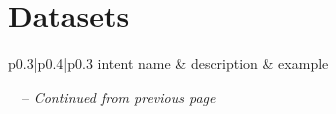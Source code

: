\documentclass[bsc,frontabs,singlespacing,parskip,deptreport]{infthesis}
\begin{document}
\chapter{Datasets}{
  \label{chap:A-datasets}
  \begin{center}
    \begin{longtable}{p{}|p{}|p{}}
    \hline
    intent name & description & example \\ 
    \hline
    \endfirsthead
    
    \hline
    {\tablename\ \thetable\ -- \textit{Continued from previous page}} \\
    \hline
    \endhead

    \hline 
     \\
    \endfoot
    \endlastfoot


\end{longtable}
\end{center}}
\end{document}
